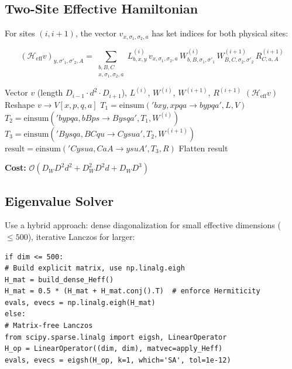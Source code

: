 \documentclass[aps,prb,onecolumn,scriptaddress]{revtex4-2}
\begin{document}
\subsection{Two-Site Effective Hamiltonian}

For sites $(i, i+1)$, the vector $v_{x, \sigma_1, \sigma_2, a}$ has ket indices for both physical sites:

\begin{equation}
(\mathcal{H}_{\text{eff}} v)_{y, \sigma'_1, \sigma'_2, A} = \sum_{\substack{b, B, C \\ x, \sigma_1, \sigma_2, a}}
L^{(i)}_{b, x, y} \,
v_{x, \sigma_1, \sigma_2, a} \,
W^{(i)}_{b, B, \sigma_1, \sigma'_1} \,
W^{(i+1)}_{B, C, \sigma_2, \sigma'_2} \,
R^{(i+1)}_{C, a, A}
\end{equation}

\begin{algorithm}[H]
\caption{ApplyHeff (Two-Site) --- Corrected}
\begin{algorithmic}[1]
	\Require Vector $v$ (length $D_{i-1} \cdot d^2 \cdot D_{i+1}$), $L^{(i)}$, $W^{(i)}$, $W^{(i+1)}$, $R^{(i+1)}$
	\Ensure $(\mathcal{H}_{\text{eff}} v)$
	\State Reshape $v \to V[x, p, q, a]$ 
	\State $T_1 = \text{einsum}('bxy,xpqa \to bypqa', L, V)$ 
	\State $T_2 = \text{einsum}('bypqa,bBps \to Bysqa', T_1, W^{(i)})$ 
	\State $T_3 = \text{einsum}('Bysqa,BCqu \to Cysua', T_2, W^{(i+1)})$ 
	\State $\text{result} = \text{einsum}('Cysua,CaA \to ysuA', T_3, R)$ 
	\State \Return Flatten result 
\end{algorithmic}
\end{algorithm}

\textbf{Cost:} $\mathcal{O}(D_W D^2 d^2 + D_W^2 D^2 d + D_W D^3)$

\subsection{Eigenvalue Solver}

Use a hybrid approach: dense diagonalization for small effective dimensions ($\leq 500$), iterative Lanczos for larger:

\begin{verbatim}
if dim <= 500:
# Build explicit matrix, use np.linalg.eigh
H_mat = build_dense_Heff()
H_mat = 0.5 * (H_mat + H_mat.conj().T)  # enforce Hermiticity
evals, evecs = np.linalg.eigh(H_mat)
else:
# Matrix-free Lanczos
from scipy.sparse.linalg import eigsh, LinearOperator
H_op = LinearOperator((dim, dim), matvec=apply_Heff)
evals, evecs = eigsh(H_op, k=1, which='SA', tol=1e-12)
\end{verbatim}
\end{document}
